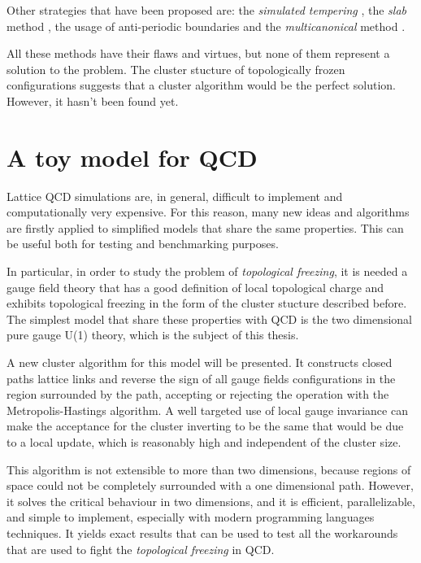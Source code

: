Other strategies that have been proposed are:
the \emph{simulated tempering} \cite{delia:1996},
the \emph{slab} method \cite{slab-1, slab-2},
the usage of anti-periodic boundaries \cite{mages:2017}
and the \emph{multicanonical} method \cite{todaro:2018}.

All these methods have their flaws and virtues, but none of them represent a solution to the problem.
The cluster stucture of topologically frozen configurations suggests that a cluster algorithm would be the perfect solution.
However, it hasn't been found yet.

\section*{A toy model for QCD}
Lattice QCD simulations are, in general, difficult to implement and computationally very expensive.
For this reason, many new ideas and algorithms are firstly applied to simplified models that share the same properties.
This can be useful both for testing and benchmarking purposes.

In particular, in order to study the problem of \emph{topological freezing},
it is needed a gauge field theory that has a good definition of local topological charge and exhibits topological freezing in the form of the cluster stucture described before.
The simplest model that share these properties with QCD is the two dimensional pure gauge U(1) theory, which is the subject of this thesis.

A new cluster algorithm for this model will be presented.
It constructs closed paths lattice links and reverse the sign of all gauge fields configurations in the region surrounded by the path,
accepting or rejecting the operation with the Metropolis-Hastings algorithm.
A well targeted use of local gauge invariance can make the acceptance for the cluster inverting to be the same that would be due to a local update,
which is reasonably high%
and independent of the cluster size.

This algorithm is not extensible to more than two dimensions,
because regions of space could not be completely surrounded with a one dimensional path.
However, it solves the critical behaviour in two dimensions, and it is efficient, parallelizable, and simple to implement, especially with modern programming languages techniques.
It yields exact results that can be used to test all the workarounds that are used to fight the \emph{topological freezing} in QCD. 

